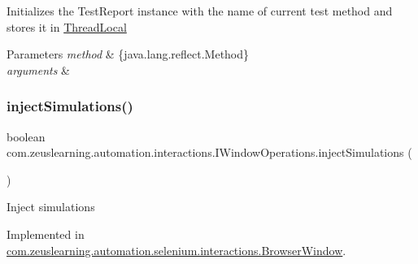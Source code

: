 Initializes the Test\+Report instance with the name of current test method and stores it in \hyperlink{}{Thread\+Local}


\begin{DoxyParams}{Parameters}
{\em method} & \{java.\+lang.\+reflect.\+Method\} \\
\hline
{\em arguments} & \\
\hline
\end{DoxyParams}
\hypertarget{interfacecom_1_1zeuslearning_1_1automation_1_1interactions_1_1IWindowOperations_a0976eede54bc52b1d8a75343c6d4b455}{}\label{interfacecom_1_1zeuslearning_1_1automation_1_1interactions_1_1IWindowOperations_a0976eede54bc52b1d8a75343c6d4b455} 
\subsubsection{\texorpdfstring{inject\+Simulations()}{injectSimulations()}}
{\footnotesize\ttfamily boolean com.\+zeuslearning.\+automation.\+interactions.\+I\+Window\+Operations.\+inject\+Simulations (\begin{DoxyParamCaption}{ }\end{DoxyParamCaption})}

Inject simulations 

Implemented in \hyperlink{classcom_1_1zeuslearning_1_1automation_1_1selenium_1_1interactions_1_1BrowserWindow_afd940a0c96c58bdedd01c1df95933852}{com.\+zeuslearning.\+automation.\+selenium.\+interactions.\+Browser\+Window}.

\hypertarget{interfacecom_1_1zeuslearning_1_1automation_1_1interactions_1_1IWindowOperations_ac2c4ec2b0ed8f6d50d24786e859f9315}{}\label{interfacecom_1_1zeuslearning_1_1automation_1_1interactions_1_1IWindowOperations_ac2c4ec2b0ed8f6d50d24786e859f9315} 
